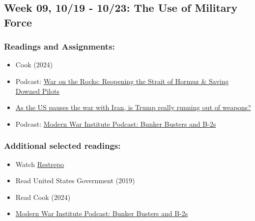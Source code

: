 \documentclass[
  letterpaper,
  DIV=11,
  numbers=noendperiod]{scrartcl}
\providecommand{\tightlist}{%
  \setlength{\itemsep}{0pt}\setlength{\parskip}{0pt}}
\begin{document}
\subsection{Week 09, 10/19 - 10/23: The Use of Military
Force}\label{week-09-1019---1023-the-use-of-military-force}

\subsubsection{Readings and
Assignments:}\label{readings-and-assignments-8}

\begin{itemize}
\tightlist
\item
  Cook (2024)
\item
  Podcast:
  \href{https://warontherocks.com/reopening-the-strait-of-hormuz-saving-downed-pilots/}{War
  on the Rocks: Reopening the Strait of Hormuz \& Saving Downed Pilots}
\item
  \href{https://bbc.com/news/articles/c0qvnk2ezp7o}{As the US pauses the
  war with Iran, is Trump really running out of weapons?}
\item
  Podcast:
  \href{https://mwi.westpoint.edu/mwi-podcast-bunker-busters-and-b-2s/}{Modern
  War Institute Podcast: Bunker Busters and B-2s}
\end{itemize}

\subsubsection{Additional selected
readings:}\label{additional-selected-readings}

\begin{itemize}
\tightlist
\item
  Watch \href{https://watchdocumentaries.com/restrepo/}{Restrepo}
\item
  Read United States Government (2019)
\end{itemize}

\begin{tcolorbox}[enhanced jigsaw, arc=.35mm, bottomrule=.15mm, bottomtitle=1mm, breakable, colback=white, colbacktitle=quarto-callout-important-color!10!white, colframe=quarto-callout-important-color-frame, coltitle=black, left=2mm, leftrule=.75mm, opacityback=0, opacitybacktitle=0.6, rightrule=.15mm, title=\textcolor{quarto-callout-important-color}{\faExclamation}\hspace{0.5em}{Friday 10/23: Discussion Day}, titlerule=0mm, toprule=.15mm, toptitle=1mm]

\begin{itemize}
\tightlist
\item
  Read Cook (2024)
\item
  \href{https://mwi.westpoint.edu/mwi-podcast-bunker-busters-and-b-2s/}{Modern
  War Institute Podcast: Bunker Busters and B-2s}
\end{itemize}

\end{tcolorbox}
\end{document}
